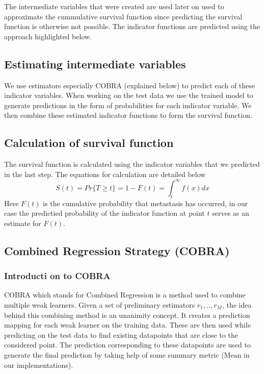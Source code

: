 \documentclass[13pt]{article}
\begin{document}
The intermediate variables that were created are used later on used to approximate the cummulative survival function since predicting the survival function is otherwise not possible. The indicator functions are predicted using the approach highlighted below. \\

\subsection{Estimating intermediate variables}
We use estimators especially COBRA (explained below) to predict each of these indicator variables. When working on the test data we use the trained model to generate predictions in the form of probabilities for each indicator variable. We then combine these estimated indicator functions to form the survival function. 

\subsection{Calculation of survival function}
The survival function is calculated using the indicator variables that we predicted in the last step. The equations for calculation are detailed below $$S(t) = Pr\{T \geq t \} = 1 - F(t) = \int_t^{\infty}f(x)dx$$
Here $F(t)$ is the cumulative probability that metastasis has occurred, in our case the predictied probability of the indicator function at point $t$ serves as an estimate for $F(t)$.

\subsection{Combined Regression Strategy (COBRA)}
\subsubsection{Introducti           on to COBRA}
COBRA which stands for Combined Regression is a method used to combine multiple weak learners. Given a set of preliminary estimators $r_1, .. , r_M$, the idea behind this combining method is an unanimity concept. It creates a prediction mapping for each weak learner on the training data. These are then used while predicting on the test data to find existing datapoints that are close to the considered point. The prediction corresponding to these datapoints are used to generate the final prediction by taking help of some summary metric (Mean in our implementations). 
\end{document}
